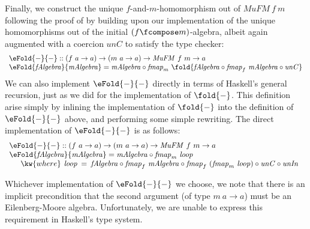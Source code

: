 Finally, we construct the unique $f$-and-$m$-homomorphism out of
$\mathit{MuFM}~f~m$ following the proof of
 by building upon our
implementation of the unique homomorphisms out of the initial $(f
\fcompose m)$-algebra, albeit again augmented with a coercion
$\mathit{unC}$ to satisfy the type checker:
\begin{displaymath}
  \begin{array}{l}
    \eFold{-}{-} :: (f~a \to a) \to (m~a \to a) \to \mathit{MuFM}~f~m \to a \\
    \eFold{\mathit{fAlgebra}}{\mathit{mAlgebra}} = \mathit{mAlgebra} \circ \mathit{fmap}_m~\fold{\mathit{fAlgebra} \circ \mathit{fmap}_f~\mathit{mAlgebra} \circ \mathit{unC}}
  \end{array}
\end{displaymath}
We can also implement $\eFold{-}{-}$ directly in terms of Haskell's
general recursion, just as we did for the implementation of
$\fold{-}$. This definition arise simply by inlining the
implementation of $\fold{-}$ into the definition of $\eFold{-}{-}$
above, and performing some simple rewriting. The direct implementation
of $\eFold{-}{-}$ is as follows:
\begin{displaymath}
  \begin{array}{l}
    \eFold{-}{-} :: (f~a \to a) \to (m~a \to a) \to \mathit{MuFM}~f~m \to a \\
    \eFold{\mathit{fAlgebra}}{\mathit{mAlgebra}} = \mathit{mAlgebra} \circ \mathit{fmap}_m~\mathit{loop} \\
    \quad\begin{array}{r@{\hspace{0.4em}}l@{\hspace{0.5em}}c@{\hspace{0.5em}}l}
      \kw{where} & \mathit{loop} &=& \mathit{fAlgebra} \circ \mathit{fmap}_f~\mathit{mAlgebra} \circ \mathit{fmap}_f~(\mathit{fmap}_m~\mathit{loop}) \circ \mathit{unC} \circ \mathit{unIn}
    \end{array}
  \end{array}
\end{displaymath}

Whichever implementation of $\eFold{-}{-}$ we choose, we note that
there is an implicit precondition that the second argument (of type
$m~a \to a$) must be an Eilenberg-Moore algebra. Unfortunately, we are
unable to express this requirement in Haskell's type system. 
